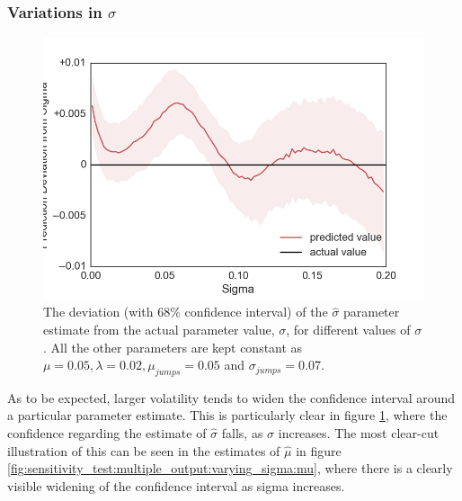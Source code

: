 \documentclass[11pt,oneside,openany,a4paper,english, report, goldenblock
]{usthesis}
\begin{document}
\subsubsection{Variations in $\sigma$}

\begin{figure}[h]
	\centering
	\includegraphics[width=0.5\linewidth]{Images/Output-Sensitivity-Results/ConvolutionalNN-MultipleOutput-ELU/Varying-Sigma/Sigma}
	\caption{The deviation (with $68\%$ confidence interval) of the $\hat{\sigma}$ parameter estimate from the actual parameter value, $\sigma$, for different values of $\sigma$. All the other parameters are kept constant as $\mu = 0.05, \lambda = 0.02, \mu_{jumps} = 0.05$ and $\sigma_{jumps} = 0.07$.}
	\label{fig:sensitivity_test:multiple_output:varying_sigma:sigma}
\end{figure}

As to be expected, larger volatility tends to widen the confidence interval around a particular parameter estimate. This is particularly clear in figure \ref{fig:sensitivity_test:multiple_output:varying_sigma:sigma}, where the confidence regarding the estimate of $\hat{\sigma}$ falls, as $\sigma$ increases.
The most clear-cut illustration of this can be seen in the estimates of $\hat{\mu}$ in figure \ref{fig:sensitivity_test:multiple_output:varying_sigma:mu}, where there is a clearly visible widening of the confidence interval as sigma increases.
\end{document}
